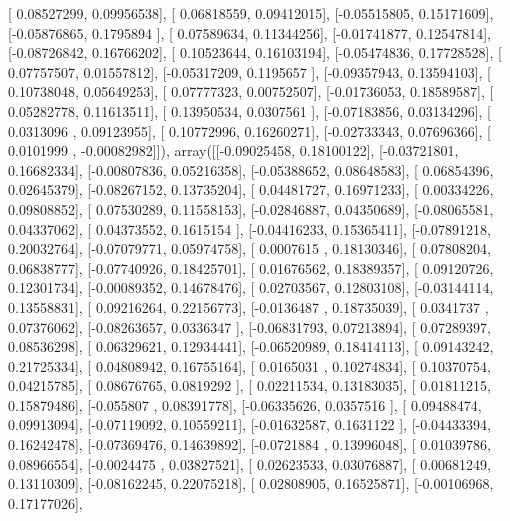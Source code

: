 \documentclass{article}
\begin{document}
       [ 0.08527299,  0.09956538],
       [ 0.06818559,  0.09412015],
       [-0.05515805,  0.15171609],
       [-0.05876865,  0.1795894 ],
       [ 0.07589634,  0.11344256],
       [-0.01741877,  0.12547814],
       [-0.08726842,  0.16766202],
       [ 0.10523644,  0.16103194],
       [-0.05474836,  0.17728528],
       [ 0.07757507,  0.01557812],
       [-0.05317209,  0.1195657 ],
       [-0.09357943,  0.13594103],
       [ 0.10738048,  0.05649253],
       [ 0.07777323,  0.00752507],
       [-0.01736053,  0.18589587],
       [ 0.05282778,  0.11613511],
       [ 0.13950534,  0.0307561 ],
       [-0.07183856,  0.03134296],
       [ 0.0313096 ,  0.09123955],
       [ 0.10772996,  0.16260271],
       [-0.02733343,  0.07696366],
       [ 0.0101999 , -0.00082982]]), array([[-0.09025458,  0.18100122],
       [-0.03721801,  0.16682334],
       [-0.00807836,  0.05216358],
       [-0.05388652,  0.08648583],
       [ 0.06854396,  0.02645379],
       [-0.08267152,  0.13735204],
       [ 0.04481727,  0.16971233],
       [ 0.00334226,  0.09808852],
       [ 0.07530289,  0.11558153],
       [-0.02846887,  0.04350689],
       [-0.08065581,  0.04337062],
       [ 0.04373552,  0.1615154 ],
       [-0.04416233,  0.15365411],
       [-0.07891218,  0.20032764],
       [-0.07079771,  0.05974758],
       [ 0.0007615 ,  0.18130346],
       [ 0.07808204,  0.06838777],
       [-0.07740926,  0.18425701],
       [ 0.01676562,  0.18389357],
       [ 0.09120726,  0.12301734],
       [-0.00089352,  0.14678476],
       [ 0.02703567,  0.12803108],
       [-0.03144114,  0.13558831],
       [ 0.09216264,  0.22156773],
       [-0.0136487 ,  0.18735039],
       [ 0.0341737 ,  0.07376062],
       [-0.08263657,  0.0336347 ],
       [-0.06831793,  0.07213894],
       [ 0.07289397,  0.08536298],
       [ 0.06329621,  0.12934441],
       [-0.06520989,  0.18414113],
       [ 0.09143242,  0.21725334],
       [ 0.04808942,  0.16755164],
       [ 0.0165031 ,  0.10274834],
       [ 0.10370754,  0.04215785],
       [ 0.08676765,  0.0819292 ],
       [ 0.02211534,  0.13183035],
       [ 0.01811215,  0.15879486],
       [-0.055807  ,  0.08391778],
       [-0.06335626,  0.0357516 ],
       [ 0.09488474,  0.09913094],
       [-0.07119092,  0.10559211],
       [-0.01632587,  0.1631122 ],
       [-0.04433394,  0.16242478],
       [-0.07369476,  0.14639892],
       [-0.0721884 ,  0.13996048],
       [ 0.01039786,  0.08966554],
       [-0.0024475 ,  0.03827521],
       [ 0.02623533,  0.03076887],
       [ 0.00681249,  0.13110309],
       [-0.08162245,  0.22075218],
       [ 0.02808905,  0.16525871],
       [-0.00106968,  0.17177026],
\end{document}
